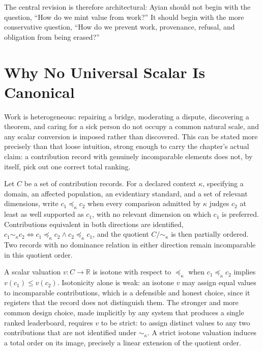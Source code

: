 The central revision is therefore architectural: Ayian should not begin with the question, ``How do we mint value from work?'' It should begin with the more conservative question, ``How do we prevent work, provenance, refusal, and obligation from being erased?''

\section{Why No Universal Scalar Is Canonical}

Work is heterogeneous: repairing a bridge, moderating a dispute, discovering a theorem, and caring for a sick person do not occupy a common natural scale, and any scalar conversion is imposed rather than discovered. This can be stated more precisely than that loose intuition, strong enough to carry the chapter's actual claim: a contribution record with genuinely incomparable elements does not, by itself, pick out one correct total ranking.

\begin{definition}
Let $C$ be a set of contribution records. For a declared context $\kappa$, specifying a domain, an affected population, an evidentiary standard, and a set of relevant dimensions, write $c_1 \preceq_\kappa c_2$ when every comparison admitted by $\kappa$ judges $c_2$ at least as well supported as $c_1$, with no relevant dimension on which $c_1$ is preferred. Contributions equivalent in both directions are identified, $c_1 \sim_\kappa c_2 \iff c_1 \preceq_\kappa c_2 \land c_2 \preceq_\kappa c_1$, and the quotient $C/{\sim_\kappa}$ is then partially ordered. Two records with no dominance relation in either direction remain incomparable in this quotient order.
\end{definition}

A scalar valuation $v : C \to \mathbb{R}$ is isotone with respect to $\preceq_\kappa$ when $c_1 \preceq_\kappa c_2$ implies $v(c_1) \leq v(c_2)$. Isotonicity alone is weak: an isotone $v$ may assign equal values to incomparable contributions, which is a defensible and honest choice, since it registers that the record does not distinguish them. The stronger and more common design choice, made implicitly by any system that produces a single ranked leaderboard, requires $v$ to be strict: to assign distinct values to any two contributions that are not identified under $\sim_\kappa$. A strict isotone valuation induces a total order on its image, precisely a linear extension of the quotient order.

